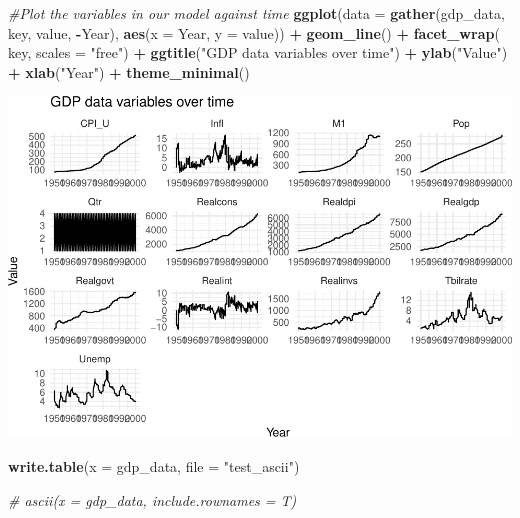 \documentclass[11pt,]{article}
\newenvironment{Shaded}{\begin{snugshade}}{\end{snugshade}}
\newcommand{\KeywordTok}[1]{\textcolor[rgb]{0.13,0.29,0.53}{\textbf{#1}}}
\newcommand{\DataTypeTok}[1]{\textcolor[rgb]{0.13,0.29,0.53}{#1}}
\newcommand{\StringTok}[1]{\textcolor[rgb]{0.31,0.60,0.02}{#1}}
\newcommand{\CommentTok}[1]{\textcolor[rgb]{0.56,0.35,0.01}{\textit{#1}}}
\newcommand{\OperatorTok}[1]{\textcolor[rgb]{0.81,0.36,0.00}{\textbf{#1}}}
\newcommand{\NormalTok}[1]{#1}
\begin{document}
\begin{Shaded}
\begin{Highlighting}[]
\CommentTok{#Plot the variables in our model against time}
\KeywordTok{ggplot}\NormalTok{(}\DataTypeTok{data =} \KeywordTok{gather}\NormalTok{(gdp_data, key, value, }\OperatorTok{-}\NormalTok{Year), }\KeywordTok{aes}\NormalTok{(}\DataTypeTok{x =}\NormalTok{ Year, }\DataTypeTok{y =}\NormalTok{ value)) }\OperatorTok{+}
\StringTok{  }\KeywordTok{geom_line}\NormalTok{() }\OperatorTok{+}
\StringTok{  }\KeywordTok{facet_wrap}\NormalTok{(}\OperatorTok{~}\StringTok{ }\NormalTok{key, }\DataTypeTok{scales =} \StringTok{"free"}\NormalTok{) }\OperatorTok{+}
\StringTok{  }\KeywordTok{ggtitle}\NormalTok{(}\StringTok{"GDP data variables over time"}\NormalTok{) }\OperatorTok{+}
\StringTok{  }\KeywordTok{ylab}\NormalTok{(}\StringTok{"Value"}\NormalTok{) }\OperatorTok{+}
\StringTok{  }\KeywordTok{xlab}\NormalTok{(}\StringTok{"Year"}\NormalTok{) }\OperatorTok{+}\StringTok{ }\KeywordTok{theme_minimal}\NormalTok{()}
\end{Highlighting}
\end{Shaded}

\includegraphics{ps4_code_files/figure-latex/plot_series-1.pdf}

\begin{Shaded}
\begin{Highlighting}[]
\KeywordTok{write.table}\NormalTok{(}\DataTypeTok{x =}\NormalTok{ gdp_data, }\DataTypeTok{file =} \StringTok{"test_ascii"}\NormalTok{)}

\CommentTok{# ascii(x = gdp_data, include.rownames = T)}
\end{Highlighting}
\end{Shaded}
\end{document}

